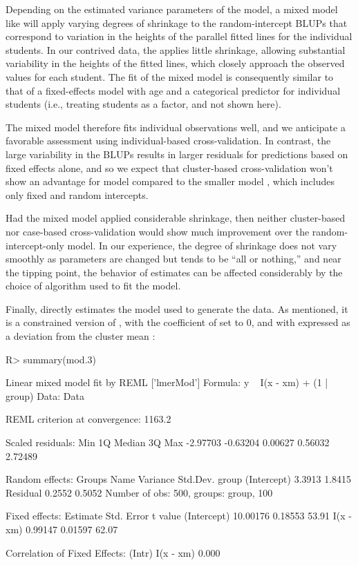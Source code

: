 \documentclass[
]{jss}
\begin{document}
Depending on the estimated variance parameters of the model, a mixed
model like  will apply varying degrees of shrinkage to the
random-intercept BLUPs that correspond to variation in the heights of
the parallel fitted lines for the individual students. In our contrived
data, the  applies little shrinkage, allowing substantial
variability in the heights of the fitted lines, which closely approach
the observed values for each student. The fit of the mixed model
 is consequently similar to that of a fixed-effects model
with age and a categorical predictor for individual students (i.e.,
treating students as a factor, and not shown here).

The mixed model  therefore fits individual observations
well, and we anticipate a favorable assessment using individual-based
cross-validation. In contrast, the large variability in the BLUPs
results in larger residuals for predictions based on fixed effects
alone, and so we expect that cluster-based cross-validation won't show
an advantage for model  compared to the smaller model
, which includes only fixed and random intercepts.

Had the mixed model applied considerable shrinkage, then neither
cluster-based nor case-based cross-validation would show much
improvement over the random-intercept-only model. In our experience, the
degree of shrinkage does not vary smoothly as parameters are changed but
tends to be ``all or nothing,'' and near the tipping point, the behavior
of estimates can be affected considerably by the choice of algorithm
used to fit the model.

Finally,  directly estimates the model used to generate the
data. As mentioned, it is a constrained version of , with
the coefficient of  set to 0, and with  expressed as a
deviation from the cluster mean :

\begin{CodeChunk}
\begin{CodeInput}
R> summary(mod.3)
\end{CodeInput}
\begin{CodeOutput}
Linear mixed model fit by REML ['lmerMod']
Formula: y ~ I(x - xm) + (1 | group)
   Data: Data

REML criterion at convergence: 1163.2

Scaled residuals: 
     Min       1Q   Median       3Q      Max 
-2.97703 -0.63204  0.00627  0.56032  2.72489 

Random effects:
 Groups   Name        Variance Std.Dev.
 group    (Intercept) 3.3913   1.8415  
 Residual             0.2552   0.5052  
Number of obs: 500, groups:  group, 100

Fixed effects:
            Estimate Std. Error t value
(Intercept) 10.00176    0.18553   53.91
I(x - xm)    0.99147    0.01597   62.07

Correlation of Fixed Effects:
          (Intr)
I(x - xm) 0.000 
\end{CodeOutput}
\end{CodeChunk}
\end{document}
